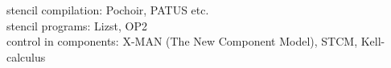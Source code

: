 stencil compilation: Pochoir, PATUS etc.\\
stencil programs: Lizst, OP2\\
control in components: X-MAN (The New Component Model), STCM, Kell-calculus